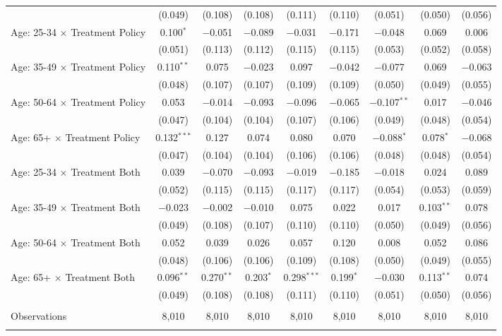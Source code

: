 \begin{tabular}{@{\extracolsep{5pt}}lcccccccc}
  & (0.049) & (0.108) & (0.108) & (0.111) & (0.110) & (0.051) & (0.050) & (0.056) \\ 
 Age: 25-34 $\times$ Treatment Policy & 0.100$^{*}$ & $-$0.051 & $-$0.089 & $-$0.031 & $-$0.171 & $-$0.048 & 0.069 & 0.006 \\ 
  & (0.051) & (0.113) & (0.112) & (0.115) & (0.115) & (0.053) & (0.052) & (0.058) \\ 
 Age: 35-49 $\times$ Treatment Policy & 0.110$^{**}$ & 0.075 & $-$0.023 & 0.097 & $-$0.042 & $-$0.077 & 0.069 & $-$0.063 \\ 
  & (0.048) & (0.107) & (0.107) & (0.109) & (0.109) & (0.050) & (0.049) & (0.055) \\ 
 Age: 50-64 $\times$ Treatment Policy & 0.053 & $-$0.014 & $-$0.093 & $-$0.096 & $-$0.065 & $-$0.107$^{**}$ & 0.017 & $-$0.046 \\ 
  & (0.047) & (0.104) & (0.104) & (0.107) & (0.106) & (0.049) & (0.048) & (0.054) \\ 
 Age: 65+ $\times$ Treatment Policy & 0.132$^{***}$ & 0.127 & 0.074 & 0.080 & 0.070 & $-$0.088$^{*}$ & 0.078$^{*}$ & $-$0.068 \\ 
  & (0.047) & (0.104) & (0.104) & (0.106) & (0.106) & (0.048) & (0.048) & (0.054) \\ 
 Age: 25-34 $\times$ Treatment Both & 0.039 & $-$0.070 & $-$0.093 & $-$0.019 & $-$0.185 & $-$0.018 & 0.024 & 0.089 \\ 
  & (0.052) & (0.115) & (0.115) & (0.117) & (0.117) & (0.054) & (0.053) & (0.059) \\ 
 Age: 35-49 $\times$ Treatment Both & $-$0.023 & $-$0.002 & $-$0.010 & 0.075 & 0.022 & 0.017 & 0.103$^{**}$ & 0.078 \\ 
  & (0.049) & (0.108) & (0.107) & (0.110) & (0.110) & (0.050) & (0.049) & (0.056) \\ 
 Age: 50-64 $\times$ Treatment Both & 0.052 & 0.039 & 0.026 & 0.057 & 0.120 & 0.008 & 0.052 & 0.086 \\ 
  & (0.048) & (0.106) & (0.106) & (0.109) & (0.108) & (0.050) & (0.049) & (0.055) \\ 
 Age: 65+ $\times$ Treatment Both & 0.096$^{**}$ & 0.270$^{**}$ & 0.203$^{*}$ & 0.298$^{***}$ & 0.199$^{*}$ & $-$0.030 & 0.113$^{**}$ & 0.074 \\ 
  & (0.049) & (0.108) & (0.108) & (0.111) & (0.110) & (0.051) & (0.050) & (0.056) \\ 
\hline \\[-1.8ex] 

Observations & 8,010 & 8,010 & 8,010 & 8,010 & 8,010 & 8,010 & 8,010 & 8,010 \\ 
\hline 
\hline \\[-1.8ex] 
\end{tabular} 